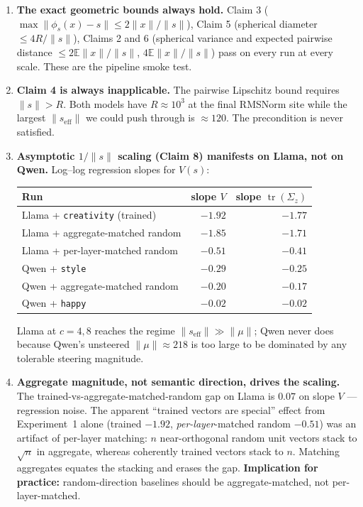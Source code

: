 \begin{enumerate}
  \item \textbf{The exact geometric bounds always hold.}
    Claim 3 ($\max \|\phi_s(x) - \hat{s}\| \le 2\|x\|/\|s\|$), Claim 5
    (spherical diameter $\le 4R/\|s\|$), Claims 2 and 6 (spherical
    variance and expected pairwise distance $\le 2\mathbb{E}\|x\|/\|s\|$,
    $4\mathbb{E}\|x\|/\|s\|$) pass on every run at every scale. These are
    the pipeline smoke test.

  \item \textbf{Claim 4 is always inapplicable.}
    The pairwise Lipschitz bound requires $\|s\| > R$. Both models have
    $R \approx 10^3$ at the final RMSNorm site while the largest
    $\|s_{\mathrm{eff}}\|$ we could push through is $\approx 120$. The
    precondition is never satisfied.

  \item \textbf{Asymptotic $1/\|s\|$ scaling (Claim 8) manifests on Llama,
    not on Qwen.} Log--log regression slopes for $V(s)$:

    \begin{center}
    \small
    \begin{tabular}{@{}lrr@{}}
      \toprule
      Run & slope $V$ & slope $\operatorname{tr}(\Sigma_z)$ \\
      \midrule
      Llama + \texttt{creativity} (trained) & $\mathbf{-1.92}$ & $-1.77$ \\
      Llama + aggregate-matched random & $\mathbf{-1.85}$ & $-1.71$ \\
      Llama + per-layer-matched random & $-0.51$ & $-0.41$ \\
      Qwen + \texttt{style} & $-0.29$ & $-0.25$ \\
      Qwen + aggregate-matched random & $-0.20$ & $-0.17$ \\
      Qwen + \texttt{happy} & $-0.02$ & $-0.02$ \\
      \bottomrule
    \end{tabular}
    \end{center}

    Llama at $c=4,8$ reaches the regime $\|s_{\mathrm{eff}}\| \gg \|\mu\|$;
    Qwen never does because Qwen's unsteered $\|\mu\| \approx 218$ is too
    large to be dominated by any tolerable steering magnitude.

  \item \textbf{Aggregate magnitude, not semantic direction, drives the
    scaling.} The trained-vs-aggregate-matched-random gap on Llama is
    $0.07$ on slope $V$ --- regression noise. The apparent
    ``trained vectors are special'' effect from Experiment~1 alone
    (trained $-1.92$, \emph{per-layer}-matched random $-0.51$) was an
    artifact of per-layer matching: $n$ near-orthogonal random unit
    vectors stack to $\sqrt{n}$ in aggregate, whereas coherently trained
    vectors stack to $n$. Matching aggregates equates the stacking and
    erases the gap. \textbf{Implication for practice:}
    random-direction baselines should be aggregate-matched, not
    per-layer-matched.


\end{enumerate}
